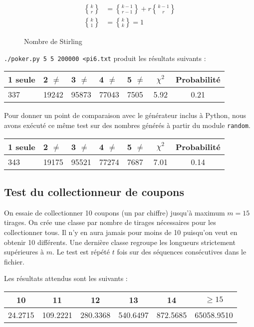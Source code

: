 \documentclass[12pt,a4paper]{article}
\begin{document}
\begin{figure}[t]
\begin{align*}
	{k \brace r} &= {k-1 \brace r-1} + r{k-1 \brace r} \\
	{k \brace 1} &= {k \brace k} = 1
\end{align*}
\caption{Nombre de Stirling}
\end{figure}

\texttt{./poker.py 5 5 200000 <pi6.txt} produit les résultats suivants :
\begin{center}
\begin{tabular}{l|l|l|l|l|c|c}
1 seule & 2 $\neq$ & 3 $\neq$ & 4 $\neq$ & 5 $\neq$
	& $\chi^2$ & Probabilité \\ \hline
337 & 19242 & 95873 & 77043 & 7505 &  5.92 &  0.21
\end{tabular}
\end{center}

Pour donner un point de comparaison avec le générateur inclus à Python,
nous avons
exécuté ce même test sur des nombres générés à partir du module \texttt{random}.

\begin{center}
\begin{tabular}{l|l|l|l|l|c|c}
1 seule & 2 $\neq$ & 3 $\neq$ & 4 $\neq$ & 5 $\neq$
	& $\chi^2$ & Probabilité \\ \hline
343 & 19175 & 95521 & 77274 & 7687 &  7.01 &  0.14
\end{tabular}
\end{center}


\subsection{Test du collectionneur de coupons}
On essaie de collectionner 10 coupons (un par chiffre)
jusqu'à maximum $m=15$ tirages.
On crée une classe par nombre de tirages nécessaires pour les collectionner tous.
Il n'y en aura jamais pour moins de 10 puisqu'on veut en obtenir 10 différents.
Une dernière classe regroupe les longueurs strictement supérieures à $m$.
Le test est répété $t$ fois sur des séquences consécutives dans le fichier.

Les résultats attendus sont les suivants :
\begin{center}
\begin{tabular}{c|c|c|c|c|c}
10 & 11 & 12 & 13 & 14 & $\geq 15$ \\ \hline
24.2715 & 109.2221 & 280.3368 & 540.6497 & 872.5685 & 65058.9510
\end{tabular}
\end{center}
\end{document}
